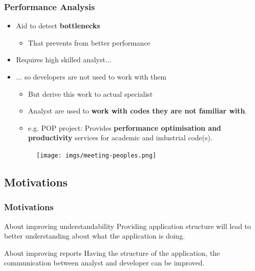 \documentclass{beamer}
\begin{document}
\begin{frame}
\frametitle{Performance Analysis}
\begin{itemize}
	\item Aid to detect \textbf{bottlenecks}
	\begin{itemize}
		\item That prevents from better performance
	\end{itemize}
	\item Requires high skilled analyst...
	\item ... so developers are not used to work with them
	\begin{itemize}
		\item But derive this work to actual specialist
		\item Analyst are used to \textbf{work with codes they are not familiar with}.
		\item e.g. POP project: Provides \textbf{performance optimisation and productivity} services for academic and industrial code(s).
	\end{itemize}

	\begin{figure}
		\texttt{[image: imgs/meeting-peoples.png]}
	\end{figure}
\end{itemize}

%
\end{frame}

\subsection{Motivations}
\begin{frame}
\frametitle{Motivations}
\begin{block}{About improving understandability}
	Providing application structure will lead to better understanding about what the application is doing.
\end{block}
\pause
\begin{block}{About improving reports}
	Having the structure of the application, the communication between analyst and developer can be improved.
\end{block}
\end{frame}
\end{document}
